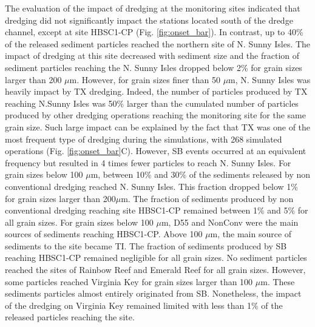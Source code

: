 \documentclass[preprint,12pt,authoryear]{elsarticle}
\begin{document}
The evaluation of the impact of dredging at the monitoring sites indicated that dredging did not significantly impact the stations located south of the dredge channel, except at site HBSC1-CP (Fig. \ref{fig:onset_bar}). In contrast, up to 40\% of the released sediment particles reached the northern site of N. Sunny Isles. The impact of dredging at this site decreased with sediment size and the fraction of sediment particles reaching the N. Sunny Isles dropped below 2\% for grain sizes larger than 200 $\mu$m. However, for grain sizes finer than 50 $\mu$m, N. Sunny Isles was heavily impact by TX dredging. Indeed, the number of particles produced by TX reaching N.Sunny Isles was 50\% larger than the cumulated number of particles produced by other dredging operations reaching the monitoring site for the same grain size. Such large impact can be explained by the fact that TX was one of the most frequent type of dredging during the simulations, with 268 simulated operations (Fig. \ref{fig:onset_bar}C). However, SB events occurred at an equivalent frequency but resulted in 4 times fewer particles to reach N. Sunny Isles. For grain sizes below 100 $\mu$m, between 10\% and 30\% of the sediments released by non conventional dredging reached N. Sunny Isles. This fraction dropped below  1\% for grain sizes larger than 200$\mu$m. The fraction of sediments produced by non conventional dredging reaching site HBSC1-CP remained between 1\% and 5\% for all grain sizes. For grain sizes below 100 $\mu$m, D55 and NonConv were the main sources of sediments reaching HBSC1-CP. Above 100 $\mu$m, the main source of sediments to the site became TI. The fraction of sediments produced by SB reaching HBSC1-CP remained negligible for all grain sizes. No sediment particles reached the sites of Rainbow Reef and Emerald Reef for all grain sizes. However, some particles reached Virginia Key for grain sizes larger than 100 $\mu$m. These sediments particles almost entirely originated from SB. Nonetheless, the impact of the dredging on Virginia Key remained limited with less than 1$\%$ of the released particles reaching the site.
\end{document}
